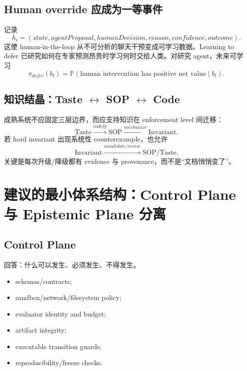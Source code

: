\documentclass[11pt,a4paper]{ctexart}
\newcommand{\Pp}{\mathbb{P}}
\begin{document}
\subsection{Human override 应成为一等事件}

记录
\begin{equation}
 h_i=(state,agentProposal,humanDecision,reason,confidence,outcome).
\end{equation}
这使 human-in-the-loop 从不可分析的聊天干预变成可学习数据。Learning to defer 已研究如何在专家预测昂贵时学习何时交给人类\parencite{hemmer2023defer}。对研究 agent，未来可学习
\begin{equation}
 \pi_{defer}(b_t)=\Pp(\text{human intervention has positive net value}\mid b_t).
\end{equation}

\subsection{知识结晶：Taste $\leftrightarrow$ SOP $\leftrightarrow$ Code}

成熟系统不应固定三层边界，而应支持知识在 enforcement level 间迁移：
\begin{equation}
 \text{Taste}\xrightarrow{codify}\text{SOP}\xrightarrow{mechanize}\text{Invariant}.
\end{equation}
若 hard invariant 出现系统性 counterexample，也允许
\begin{equation}
 \text{Invariant}\xrightarrow{invalidate/revise}\text{SOP/Taste}.
\end{equation}
关键是每次升级/降级都有 evidence 与 provenance，而不是“文档悄悄变了”。

\section{建议的最小体系结构：Control Plane 与 Epistemic Plane 分离}

\subsection{Control Plane}
回答：什么可以发生、必须发生、不得发生。
\begin{itemize}
\item schemas/contracts;
\item sandbox/network/filesystem policy;
\item evaluator identity and budget;
\item artifact integrity;
\item executable transition guards;
\item reproducibility/freeze checks.
\end{itemize}
\end{document}
